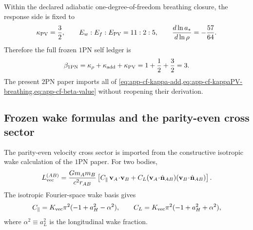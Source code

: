 \documentclass[11pt]{article}
\newcommand{\OnePN}{\mathrm{1PN}}
\newcommand{\TwoPN}{\mathrm{2PN}}
\begin{document}
Within the declared adiabatic one-degree-of-freedom breathing closure, the response side
is fixed to
\begin{equation}
\kappa_{\rm PV}=\frac32,
\qquad
E_w:E_f:E_{\rm PV}=11:2:5,
\qquad
\frac{d\ln a_*}{d\ln\rho}=-\frac{57}{64}.
\label{eq:app-cf-kappaPV-breathing}
\end{equation}
Therefore the full frozen \(\OnePN\) self ledger is
\begin{equation}
\beta_{\OnePN}
=
\kappa_\rho+\kappa_{\rm add}+\kappa_{\rm PV}
=
1+\frac12+\frac32=3.
\label{eq:app-cf-beta-value}
\end{equation}
The present \(\TwoPN\) paper imports all of
\cref{eq:app-cf-kappa-add,eq:app-cf-kappaPV-breathing,eq:app-cf-beta-value}
without reopening their derivation.

\subsection{Frozen wake formulas and the parity-even cross sector}
\label{app:carry-forward-wake}

The parity-even velocity cross sector is imported from the constructive isotropic wake
calculation of the \(\OnePN\) paper.  For two bodies,
\begin{equation}
L_{\rm vec}^{(AB)}
=
\frac{Gm_A m_B}{c^2r_{AB}}
\left[
C_\parallel\,\mathbf v_A\!\cdot\!\mathbf v_B
+
C_L(\mathbf v_A\!\cdot\!\hat{\mathbf n}_{AB})(\mathbf v_B\!\cdot\!\hat{\mathbf n}_{AB})
\right].
\label{eq:app-cf-cross-sector-template}
\end{equation}
The isotropic Fourier-space wake basis gives
\begin{equation}
C_\parallel=K_{\rm vec}\pi^2(-1+a_H^2-\alpha^2),
\qquad
C_L=K_{\rm vec}\pi^2(-1+a_H^2+\alpha^2),
\label{eq:app-cf-cross-coeff-template}
\end{equation}
where \(\alpha^2\equiv a_L^2\) is the longitudinal wake fraction.
\end{document}
